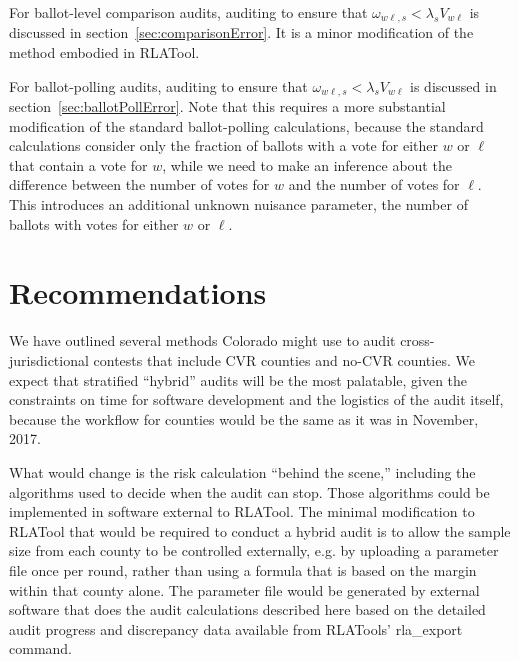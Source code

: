 \documentclass[12pt]{article}
\begin{document}
For ballot-level comparison audits, auditing to ensure that $\omega_{w\ell,s} < \lambda_s V_{w\ell}$
is discussed in section~\ref{sec:comparisonError}.  It is a minor modification of the method
embodied in RLATool.

For ballot-polling audits, auditing to ensure that $\omega_{w\ell,s} < \lambda_s V_{w\ell}$ is discussed in section~\ref{sec:ballotPollError}.
Note that this requires a more substantial modification of the standard ballot-polling calculations,
because the standard calculations consider only the fraction of ballots with a vote for either 
$w$ or $\ell$ that contain a vote for $w$, while we need to make an inference about the 
difference between the number of votes for $w$ and the number of votes for $\ell$.
This introduces an additional unknown nuisance parameter, the number of ballots with votes for either
$w$ or $\ell$.







\section{Recommendations} \label{sec:recommendations}

We have outlined several methods Colorado might use to audit cross-jurisdictional contests
that include CVR counties and no-CVR counties.
We expect that stratified ``hybrid'' audits will be the most palatable,
given the constraints on time for software development and the logistics
of the audit itself, because the workflow for counties would be the same
as it was in November, 2017.

What would change is the risk calculation ``behind the scene,'' including the
algorithms used to decide when the audit can stop.
Those algorithms could be implemented in software external to RLATool.
The minimal modification to RLATool that would be required to conduct
a hybrid audit is to allow the sample size from each county to be controlled externally,
e.g. by uploading a parameter file once per round,
rather than using a formula that is based on the margin within that county alone.
The parameter file would be generated by external software that does the
audit calculations described here based on the detailed
audit progress and discrepancy data available from RLATools' rla\_export command.
\end{document}

